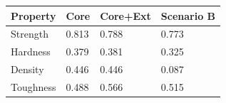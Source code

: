 \begin{tabular}{llll}
\toprule
Property & Core & Core+Ext & Scenario B \\
\midrule
Strength & 0.813 & 0.788 & 0.773 \\
Hardness & 0.379 & 0.381 & 0.325 \\
Density & 0.446 & 0.446 & 0.087 \\
Toughness & 0.488 & 0.566 & 0.515 \\
\bottomrule
\end{tabular}
